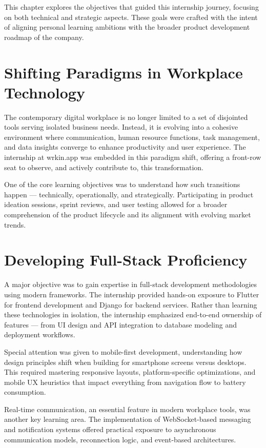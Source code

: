 This chapter explores the objectives that guided this internship journey, focusing on both technical and strategic aspects. These goals were crafted with the intent of aligning personal learning ambitions with the broader product development roadmap of the company.

\section{Shifting Paradigms in Workplace Technology}

The contemporary digital workplace is no longer limited to a set of disjointed tools serving isolated business needs. Instead, it is evolving into a cohesive environment where communication, human resource functions, task management, and data insights converge to enhance productivity and user experience. The internship at wrkin.app was embedded in this paradigm shift, offering a front-row seat to observe, and actively contribute to, this transformation.

One of the core learning objectives was to understand how such transitions happen — technically, operationally, and strategically. Participating in product ideation sessions, sprint reviews, and user testing allowed for a broader comprehension of the product lifecycle and its alignment with evolving market trends.

\section{Developing Full-Stack Proficiency}

A major objective was to gain expertise in full-stack development methodologies using modern frameworks. The internship provided hands-on exposure to Flutter for frontend development and Django for backend services. Rather than learning these technologies in isolation, the internship emphasized end-to-end ownership of features — from UI design and API integration to database modeling and deployment workflows.

Special attention was given to mobile-first development, understanding how design principles shift when building for smartphone screens versus desktops. This required mastering responsive layouts, platform-specific optimizations, and mobile UX heuristics that impact everything from navigation flow to battery consumption.

Real-time communication, an essential feature in modern workplace tools, was another key learning area. The implementation of WebSocket-based messaging and notification systems offered practical exposure to asynchronous communication models, reconnection logic, and event-based architectures.

